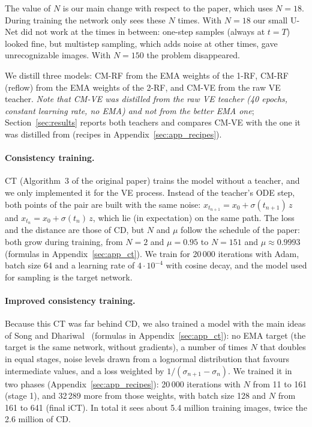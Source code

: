 \documentclass{article}
\begin{document}
The value of $N$ is our main change with respect to the paper, which uses
$N = 18$. During training the network only sees these $N$ times. With $N = 18$
our small U-Net did not work at the times in between: one-step samples (always
at $t = T$) looked fine, but multistep sampling, which adds noise at other
times, gave unrecognizable images. With $N = 150$ the problem disappeared.

We distill three models: CM-RF from the EMA weights of the 1-RF, CM-RF
(reflow) from the EMA weights of the 2-RF, and CM-VE from the raw VE teacher.
\emph{Note that CM-VE was distilled from the raw VE teacher (40 epochs, constant
learning rate, no EMA) and not from the better EMA one}; Section~\ref{sec:results}
reports both teachers and compares CM-VE with the one it was distilled from
(recipes in Appendix~\ref{sec:app_recipes}).

\paragraph{Consistency training.} CT (Algorithm~3 of the original paper) trains
the model without a teacher, and we only implemented it for the VE process.
Instead of the teacher's ODE step, both points of the pair are built with the
same noise: $x_{t_{n+1}} = x_0 + \sigma(t_{n+1})\, z$ and
$x_{t_n} = x_0 + \sigma(t_n)\, z$, which lie (in expectation) on the same path.
The loss and the distance are those of CD, but $N$ and $\mu$ follow the schedule
of the paper: both grow during training, from $N = 2$ and $\mu = 0.95$ to
$N = 151$ and $\mu \approx 0.9993$ (formulas in Appendix~\ref{sec:app_ct}). We
train for 20\,000 iterations with Adam, batch size 64 and a learning rate of
$4\cdot10^{-4}$ with cosine decay, and the model used for sampling is the target
network.

\paragraph{Improved consistency training.} Because this CT was far behind CD, we
also trained a model with the main ideas of Song and
Dhariwal~\cite{song2024improved} (formulas in Appendix~\ref{sec:app_ct}): no EMA
target (the target is the same network, without gradients), a number of times
$N$ that doubles in equal stages, noise levels drawn from a lognormal
distribution that favours intermediate values, and a loss weighted by
$1/(\sigma_{n+1} - \sigma_n)$. We trained it in two phases
(Appendix~\ref{sec:app_recipes}): 20\,000 iterations with $N$ from 11 to 161
(stage 1), and 32\,289 more from those weights, with batch size 128 and $N$ from
161 to 641 (final iCT). In total it sees about 5.4 million training images,
twice the 2.6 million of CD.
\end{document}
